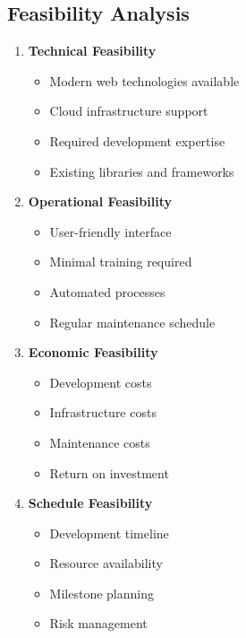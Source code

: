 \documentclass[12pt,a4paper]{report}
\begin{document}
\subsection{Feasibility Analysis}
\begin{enumerate}
    \item \textbf{Technical Feasibility}
    \begin{itemize}
        \item Modern web technologies available
        \item Cloud infrastructure support
        \item Required development expertise
        \item Existing libraries and frameworks
    \end{itemize}
    
    \item \textbf{Operational Feasibility}
    \begin{itemize}
        \item User-friendly interface
        \item Minimal training required
        \item Automated processes
        \item Regular maintenance schedule
    \end{itemize}
    
    \item \textbf{Economic Feasibility}
    \begin{itemize}
        \item Development costs
        \item Infrastructure costs
        \item Maintenance costs
        \item Return on investment
    \end{itemize}
    
    \item \textbf{Schedule Feasibility}
    \begin{itemize}
        \item Development timeline
        \item Resource availability
        \item Milestone planning
        \item Risk management
    \end{itemize}
\end{enumerate}
\end{document}
